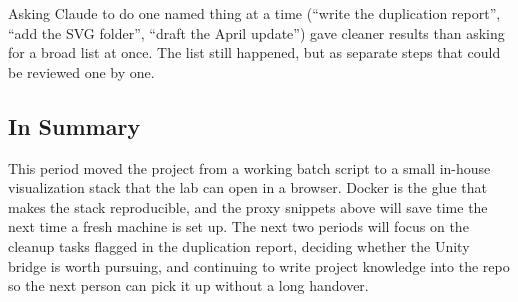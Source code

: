 \documentclass[a4paper,12pt]{article}
\begin{document}
\begin{tcolorbox}[title=Small, named changes work better than ``do everything'']
Asking Claude to do one named thing at a time (``write the duplication report'', ``add the SVG folder'', ``draft the April update'') gave cleaner results than asking for a broad list at once. The list still happened, but as separate steps that could be reviewed one by one.
\end{tcolorbox}

\subsection{In Summary}
This period moved the project from a working batch script to a small in-house visualization stack that the lab can open in a browser. Docker is the glue that makes the stack reproducible, and the proxy snippets above will save time the next time a fresh machine is set up. The next two periods will focus on the cleanup tasks flagged in the duplication report, deciding whether the Unity bridge is worth pursuing, and continuing to write project knowledge into the repo so the next person can pick it up without a long handover.
\end{document}
